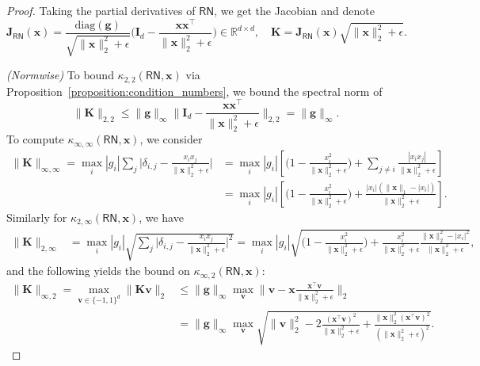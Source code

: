 \documentclass[namedate,webpdf,imanum]{ima-authoring-template}
\newcommand{\Real}{\mathbb{R}}
\newcommand{\Matrix}[1]{\mathbf{#1}}
\newcommand{\trans}{\intercal}
\newcommand{\diag}[2][]{\mathrm{diag}#1( #2 #1)}
\newcommand{\Norm}[3][]{#1\| #2 #1\|_{\mathrm{#3}}}
\newcommand{\Layer}[1]{\mathsf{#1}}
\newcommand{\cond}[3][]{\kappa_{\mathrm{#2}} #1( #3 #1)}
\numberwithin{equation}{section}
\begin{document}
\begin{proof}
Taking the partial derivatives of $\Layer{RN}$, we get the Jacobian and denote
\begin{equation*}
    \Matrix{J}_{\Layer{RN}}(\Matrix{x}) = \frac{\diag{\Matrix{g}}}{\sqrt{\Norm{\Matrix{x}}{2}^2 + \epsilon}} \bigg( \Matrix{I}_d - \frac{\Matrix{x} \Matrix{x}^\trans}{\Norm{\Matrix{x}}{2}^2 + \epsilon} \bigg) \in \Real^{d \times d}, \quad \Matrix{K} = \Matrix{J}_{\Layer{RN}}(\Matrix{x}) \sqrt{\Norm{\Matrix{x}}{2}^2 + \epsilon}.
\end{equation*}

\emph{(Normwise)}
To bound $\cond{2,2}{\Layer{RN}, \Matrix{x}}$ via Proposition~\ref{proposition:condition_numbers}, we bound the spectral norm of
\begin{equation*}
    \Norm{\Matrix{K}}{2,2} \leq \Norm{\Matrix{g}}{\infty} \Norm[\bigg]{\Matrix{I}_d - \frac{\Matrix{x} \Matrix{x}^\trans}{\Norm{\Matrix{x}}{2}^2 + \epsilon}}{2,2} = \Norm{\Matrix{g}}{\infty}.
\end{equation*}
To compute $\cond{\infty,\infty}{\Layer{RN}, \Matrix{x}}$, we consider
\begin{align*}
    \Norm{\Matrix{K}}{\infty,\infty} = \max_{i} |g_i| \sum_{j} \bigg|\delta_{i,j} - \frac{x_i x_j}{\Norm{\Matrix{x}}{2}^2 + \epsilon}\bigg| &= \max_{i} |g_i| \left[ \bigg( 1 - \frac{x_i^2}{\Norm{\Matrix{x}}{2}^2 + \epsilon} \bigg) + \sum_{j \neq i} \frac{|x_i x_j|}{\Norm{\Matrix{x}}{2}^2 + \epsilon} \right] \\
    &= \max_{i} |g_i| \left[ \bigg( 1 - \frac{x_i^2}{\Norm{\Matrix{x}}{2}^2 + \epsilon} \bigg) + \frac{|x_i| (\Norm{\Matrix{x}}{1} - |x_i|)}{\Norm{\Matrix{x}}{2}^2 + \epsilon} \right].
\end{align*}
Similarly for $\cond{2,\infty}{\Layer{RN}, \Matrix{x}}$, we have
\begin{align*}
    \Norm{\Matrix{K}}{2,\infty} &= \max_{i} |g_i| \sqrt{\sum_{j} \bigg|\delta_{i,j} - \frac{x_i x_j}{\Norm{\Matrix{x}}{2}^2 + \epsilon}\bigg|^2} = \max_{i} |g_i| \sqrt{\bigg( 1 - \frac{x_i^2}{\Norm{\Matrix{x}}{2}^2 + \epsilon} \bigg) + \frac{x_i^2}{\Norm{\Matrix{x}}{2}^2 + \epsilon} \frac{\Norm{\Matrix{x}}{2}^2 - |x_i|^2}{\Norm{\Matrix{x}}{2}^2 + \epsilon}},
\end{align*}
and the following yields the bound on $\cond{\infty,2}{\Layer{RN}, \Matrix{x}}$:
\begin{align*}
    \Norm{\Matrix{K}}{\infty,2} = \max_{\Matrix{v} \in \{ -1,1 \}^d} \Norm{\Matrix{K} \Matrix{v}}{2} &\leq \Norm{\Matrix{g}}{\infty} \max_{\Matrix{v}} \Norm[\bigg]{\Matrix{v} - \Matrix{x} \frac{\Matrix{x}^\trans \Matrix{v}}{\Norm{\Matrix{x}}{2}^2 + \epsilon}}{2} \\
    &= \Norm{\Matrix{g}}{\infty} \max_{\Matrix{v}} \sqrt{\Norm{\Matrix{v}}{2}^2 - 2 \frac{(\Matrix{x}^\trans \Matrix{v})^2}{\Norm{\Matrix{x}}{2}^2 + \epsilon} + \frac{\Norm{\Matrix{x}}{2}^2 (\Matrix{x}^\trans \Matrix{v})^2}{(\Norm{\Matrix{x}}{2}^2 + \epsilon)^2}}.
\end{align*}


\end{proof}
\end{document}
